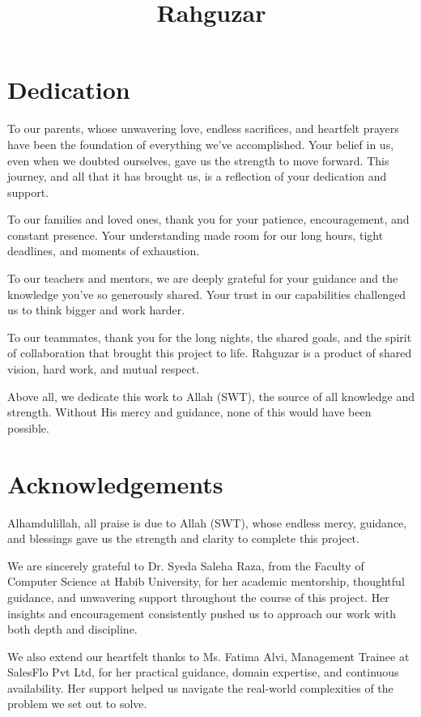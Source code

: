 \documentclass[12pt,twosided]{report}
\title{Rahguzar}
\begin{document}

\chapter*{Dedication}
To our parents, whose unwavering love, endless sacrifices, and heartfelt prayers have been the foundation of everything we’ve accomplished. Your belief in us, even when we doubted ourselves, gave us the strength to move forward. This journey, and all that it has brought us, is a reflection of your dedication and support.

To our families and loved ones, thank you for your patience, encouragement, and constant presence. Your understanding made room for our long hours, tight deadlines, and moments of exhaustion.

To our teachers and mentors, we are deeply grateful for your guidance and the knowledge you’ve so generously shared. Your trust in our capabilities challenged us to think bigger and work harder.

To our teammates, thank you for the long nights, the shared goals, and the spirit of collaboration that brought this project to life. Rahguzar is a product of shared vision, hard work, and mutual respect.

Above all, we dedicate this work to Allah (SWT), the source of all knowledge and strength. Without His mercy and guidance, none of this would have been possible.



\chapter*{Acknowledgements}
Alhamdulillah, all praise is due to Allah (SWT), whose endless mercy, guidance, and blessings gave us the strength and clarity to complete this project.

We are sincerely grateful to Dr. Syeda Saleha Raza, from the Faculty of Computer Science at Habib University, for her academic mentorship, thoughtful guidance, and unwavering support throughout the course of this project. Her insights and encouragement consistently pushed us to approach our work with both depth and discipline.

We also extend our heartfelt thanks to Ms. Fatima Alvi, Management Trainee at SalesFlo Pvt Ltd, for her practical guidance, domain expertise, and continuous availability. Her support helped us navigate the real-world complexities of the problem we set out to solve.
\end{document}
